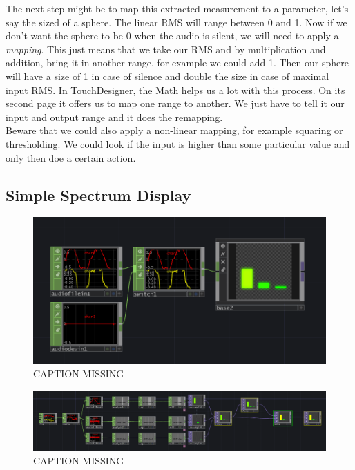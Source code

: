 The next step might be to map this extracted measurement to a parameter, let's say the sized of a sphere. The linear RMS will range between 0 and 1. Now if we don't want the sphere to be 0 when the audio is silent, we will need to apply a \textit{mapping}. This just means that we take our RMS and by multiplication and addition, bring it in another range, for example we could add 1. Then our sphere will have a size of 1 in case of silence and double the size in case of maximal input RMS. In TouchDesigner, the Math \CHOP helps us a lot with this process. On its second page it offers us to map one range to another. We just have to tell it our input and output range and it does the remapping.\\
Beware that we could also apply a non-linear mapping, for example squaring or thresholding. We could look if the input is higher than some particular value and only then doe a certain action.




\subsection{Simple Spectrum Display}
\begin{figure}[H]
	\centering
	\includegraphics[width=\textwidth]{img/simpleSpecOverview.PNG}
	\caption[shortCaption]
	{CAPTION MISSING}
	\label{fig:label}
\end{figure}

\begin{figure}[H]
	\centering
	\includegraphics[width=\textwidth]{img/simpleSpec_inside.PNG}
	\caption[shortCaption]
	{CAPTION MISSING}
	\label{fig:label}
\end{figure}

